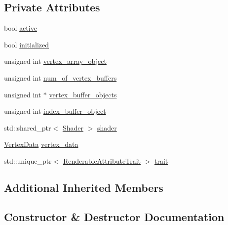 \subsection*{Private Attributes}
\begin{DoxyCompactItemize}
\item 
bool \hyperlink{class_graphics_1_1_renderable_a5ee90a804fea73ddfaeed77086ecead4}{active}
\item 
bool \hyperlink{class_graphics_1_1_renderable_af3a7a7d0813999e78bc1ad561fae6db1}{initialized}
\item 
unsigned int \hyperlink{class_graphics_1_1_renderable_aabfa91ebff7b10decd54119d663044ef}{vertex\+\_\+array\+\_\+object}
\item 
unsigned int \hyperlink{class_graphics_1_1_renderable_aa946a73c8b63ece526b871728f0e48c3}{num\+\_\+of\+\_\+vertex\+\_\+buffers}
\item 
unsigned int $\ast$ \hyperlink{class_graphics_1_1_renderable_acc80598476e4560582f3bbd4a67b52df}{vertex\+\_\+buffer\+\_\+objects}
\item 
unsigned int \hyperlink{class_graphics_1_1_renderable_a3b2c066b589a4ab9682d1a17f4f2cfec}{index\+\_\+buffer\+\_\+object}
\item 
std\+::shared\+\_\+ptr$<$ \hyperlink{class_graphics_1_1_shader}{Shader} $>$ \hyperlink{class_graphics_1_1_renderable_a6c951dfc9a00d3f3f79550112d0f40e3}{shader}
\item 
\hyperlink{class_graphics_1_1_vertex_data}{Vertex\+Data} \hyperlink{class_graphics_1_1_renderable_a5077fe6a71021f0bd4ebc8d24cdf544b}{vertex\+\_\+data}
\item 
std\+::unique\+\_\+ptr$<$ \hyperlink{class_graphics_1_1_renderable_attribute_trait}{Renderable\+Attribute\+Trait} $>$ \hyperlink{class_graphics_1_1_renderable_ad0715144ebe93916b1344c286c4a9a38}{trait}
\end{DoxyCompactItemize}
\subsection*{Additional Inherited Members}


\subsection{Constructor \& Destructor Documentation}
\hypertarget{class_graphics_1_1_renderable_a2c99d41631558194811f6f4c61a7f464}{}

